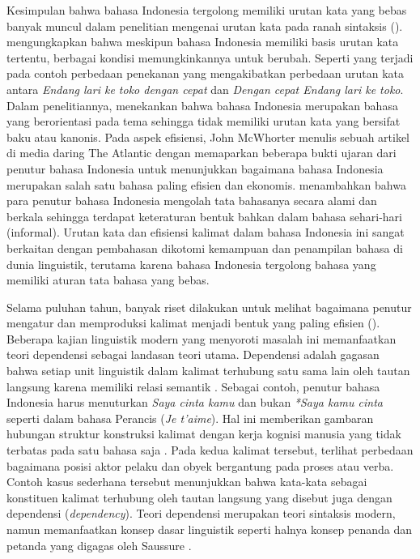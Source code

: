 Kesimpulan bahwa bahasa Indonesia tergolong memiliki urutan kata yang bebas banyak muncul dalam penelitian mengenai urutan kata pada ranah sintaksis (\citealp{stack2005word, postman2004processing}). \citet[pp. 209-268]{sneddon2010indonesian} mengungkapkan bahwa meskipun bahasa Indonesia memiliki basis urutan kata tertentu, berbagai kondisi memungkinkannya untuk berubah. Seperti yang terjadi pada contoh perbedaan penekanan yang mengakibatkan perbedaan urutan kata antara \textit{Endang lari ke toko dengan cepat} dan \textit{Dengan cepat Endang lari ke toko}. Dalam penelitiannya, \cite{postman2004processing} menekankan bahwa bahasa Indonesia merupakan bahasa yang berorientasi pada tema sehingga tidak memiliki urutan kata yang bersifat baku atau kanonis. Pada aspek efisiensi, John McWhorter menulis sebuah artikel di media daring The Atlantic \citep{mcwhorter2016efficient} dengan memaparkan beberapa bukti ujaran dari penutur bahasa Indonesia untuk menunjukkan bagaimana bahasa Indonesia merupakan salah satu bahasa paling efisien dan ekonomis. \cite{mcwhorter2016efficient} menambahkan bahwa para penutur bahasa Indonesia mengolah tata bahasanya secara alami dan berkala sehingga terdapat keteraturan bentuk bahkan dalam bahasa sehari-hari (informal). Urutan kata dan efisiensi kalimat dalam bahasa Indonesia ini sangat berkaitan dengan pembahasan dikotomi kemampuan dan penampilan bahasa di dunia linguistik, terutama karena bahasa Indonesia tergolong bahasa yang memiliki aturan tata bahasa yang bebas.

Selama puluhan tahun, banyak riset dilakukan untuk melihat bagaimana penutur mengatur dan memproduksi kalimat menjadi bentuk yang paling efisien (\citealp{chomsky2005three, hawkins2004efficiency, zipf1935psycho, zipf1949human}). Beberapa kajian linguistik modern yang menyoroti masalah ini memanfaatkan teori dependensi sebagai landasan teori utama. Dependensi adalah gagasan bahwa setiap unit linguistik dalam kalimat terhubung satu sama lain oleh tautan langsung karena memiliki relasi semantik \citep{tesniere1959elements}. Sebagai contoh, penutur bahasa Indonesia harus menuturkan \textit{Saya cinta kamu} dan bukan \textit{*Saya kamu cinta} seperti dalam bahasa Perancis (\textit{Je t'aime}). Hal ini memberikan gambaran hubungan struktur konstruksi kalimat dengan kerja kognisi manusia yang tidak terbatas pada satu bahasa saja \citep{gibson2000dependency}. Pada kedua kalimat tersebut, terlihat perbedaan bagaimana posisi aktor pelaku dan obyek bergantung pada proses atau verba. Contoh kasus sederhana tersebut menunjukkan bahwa kata-kata sebagai konstituen kalimat terhubung oleh tautan langsung yang disebut juga dengan dependensi (\textit{dependency}). Teori dependensi merupakan teori sintaksis modern, namun memanfaatkan konsep dasar linguistik seperti halnya konsep penanda dan petanda yang digagas oleh Saussure \citep{key2017course}. 

